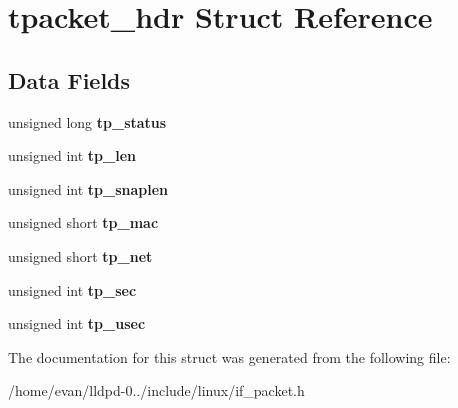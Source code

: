 \section{tpacket\-\_\-hdr \-Struct \-Reference}
\label{structtpacket__hdr}
\subsection*{\-Data \-Fields}
\begin{DoxyCompactItemize}
\item 
unsigned long {\bfseries tp\-\_\-status}\label{structtpacket__hdr_a2a71da500d21d2c37dbc82d811c3250c}

\item 
unsigned int {\bfseries tp\-\_\-len}\label{structtpacket__hdr_adb814a3e2301113367bf6bd88b67a3c9}

\item 
unsigned int {\bfseries tp\-\_\-snaplen}\label{structtpacket__hdr_a544b8bd2b93b569e3f58258021e0d16c}

\item 
unsigned short {\bfseries tp\-\_\-mac}\label{structtpacket__hdr_afcfc91b565c6218674a72a968a5190ed}

\item 
unsigned short {\bfseries tp\-\_\-net}\label{structtpacket__hdr_a4dee3b75845274a14b706a4101d8af9f}

\item 
unsigned int {\bfseries tp\-\_\-sec}\label{structtpacket__hdr_ad4a9a0f5c407faa9f5f0684cbf6b6d9f}

\item 
unsigned int {\bfseries tp\-\_\-usec}\label{structtpacket__hdr_aa05a975b108d65d3ee05d3056a281fd0}

\end{DoxyCompactItemize}


\-The documentation for this struct was generated from the following file\-:\begin{DoxyCompactItemize}
\item 
/home/evan/lldpd-\/0../include/linux/if\-\_\-packet.\-h\end{DoxyCompactItemize}
